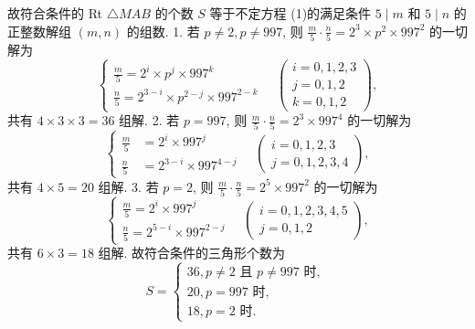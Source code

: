 故符合条件的 Rt $\triangle M A B$ 的个数 $S$ 等于不定方程 (1)的满足条件 $5 \mid m$ 和 $5 \mid n$ 的正整数解组 $(m, n)$ 的组数.
1. 若 $p \neq 2, p \neq 997$, 则 $\frac{m}{5} \cdot \frac{n}{5}=2^3 \times p^2 \times 997^2$ 的一切解为
$$
\left\{\begin{array}{l}
\frac{m}{5}=2^i \times p^j \times 997^k \\
\frac{n}{5}=2^{3-i} \times p^{2-j} \times 997^{2-k}
\end{array} \quad\left(\begin{array}{l}
i=0,1,2,3 \\
j=0,1,2 \\
k=0,1,2
\end{array}\right),\right.
$$
共有 $4 \times 3 \times 3=36$ 组解.
2. 若 $p=997$, 则 $\frac{m}{5} \cdot \frac{n}{5}=2^3 \times 997^4$ 的一切解为
$$
\left\{\begin{array}{ll}
\frac{m}{5} & =2^i \times 997^j \\
\frac{n}{5} & =2^{3-i} \times 997^{4-j}
\end{array} \quad\left(\begin{array}{l}
i=0,1,2,3 \\
j=0,1,2,3,4
\end{array}\right),\right.
$$
共有 $4 \times 5=20$ 组解.
3. 若 $p=2$, 则 $\frac{m}{5} \cdot \frac{n}{5}=2^5 \times 997^2$ 的一切解为
$$
\left\{\begin{array}{ll}
\frac{m}{5}=2^i \times 997^j \\
\frac{n}{5}=2^{5-i} \times 997^{2-j}
\end{array} \quad\left(\begin{array}{l}
i=0,1,2,3,4,5 \\
j=0,1,2
\end{array}\right),\right.
$$
共有 $6 \times 3=18$ 组解.
故符合条件的三角形个数为
$$
S=\left\{\begin{array}{l}
36, p \neq 2 \text { 且 } p \neq 997 \text { 时, } \\
20, p=997 \text { 时, } \\
18, p=2 \text { 时.
}
\end{array}\right.
$$



